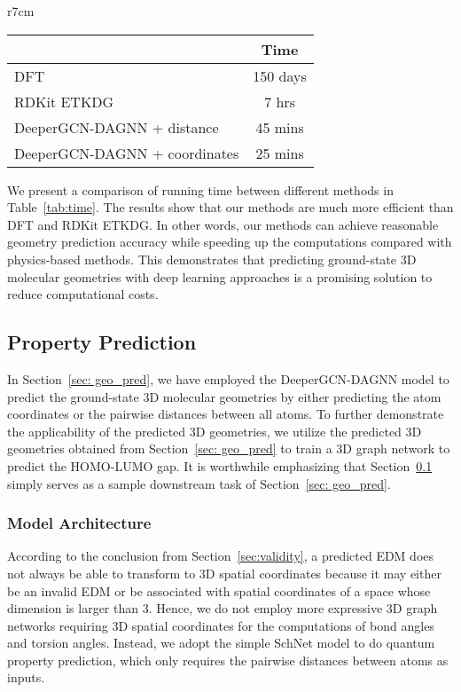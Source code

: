 \documentclass{article}
\begin{document}
\begin{wraptable}[10]{r}{7cm}\vspace{-0.4cm}
    \small
    \centering
    \caption{Time needed to predict 3D geometries over the entire test set. We time until coordinates are obtained.}
    \addtolength{\tabcolsep}{-5pt}
    \begin{tabular}{lc}
    \toprule
    & Time \\
    \midrule
    DFT & 150 days \\
    RDKit ETKDG & 7 hrs \\
DeeperGCN-DAGNN + distance & 45 mins \\
    DeeperGCN-DAGNN + coordinates & 25 mins \\
    \bottomrule
    \end{tabular}
    \label{tab:time}
\end{wraptable}

We present a comparison of running time between different methods in Table~\ref{tab:time}. The results show that our methods are much more efficient than DFT and RDKit ETKDG. In other words, our methods can achieve reasonable geometry prediction accuracy while speeding up the computations compared with physics-based methods. This demonstrates that predicting ground-state 3D molecular geometries with deep learning approaches is a promising solution to reduce computational costs.



\subsection{Property Prediction}
\label{sec:prop_pred}


In Section~\ref{sec: geo_pred}, we have employed the DeeperGCN-DAGNN model to predict the ground-state 3D molecular geometries by either predicting the atom coordinates or the pairwise distances between all atoms. To further demonstrate the applicability of the predicted 3D geometries, we utilize the predicted 3D geometries obtained from Section~\ref{sec: geo_pred} to train a 3D graph network to predict the HOMO-LUMO gap. It is worthwhile emphasizing that Section~\ref{sec:prop_pred} simply serves as a sample downstream task of Section~\ref{sec: geo_pred}.

\subsubsection{Model Architecture}

According to the conclusion from Section~\ref{sec:validity}, a predicted EDM does not always be able to transform to 3D spatial coordinates because it may either be an invalid EDM or be associated with spatial coordinates of a space whose dimension is larger than 3. Hence, we do not employ more expressive 3D graph networks requiring 3D spatial coordinates for the computations of bond angles and torsion angles. Instead,  we adopt the simple SchNet \cite{schutt2017schnet} model to do quantum property prediction, which only requires the pairwise distances between atoms as inputs.
\end{document}
